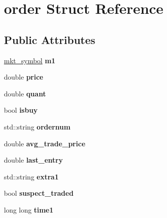 \hypertarget{structorder}{}\section{order Struct Reference}
\label{structorder}
\subsection*{Public Attributes}
\begin{DoxyCompactItemize}
\item 
\mbox{\label{structorder_adfdd240082d4e6d30de53a47ccd678bc}} 
\mbox{\hyperlink{structmkt__symbol}{mkt\+\_\+symbol}} {\bfseries m1}
\item 
\mbox{\label{structorder_abbe37d55c9bd4ffbbf69da056984d0fa}} 
double {\bfseries price}
\item 
\mbox{\label{structorder_ad2ba5985a42f5e49b15731bac9a29f5f}} 
double {\bfseries quant}
\item 
\mbox{\label{structorder_a56c072b0bd1f39f21e824b1de18c375d}} 
bool {\bfseries isbuy}
\item 
\mbox{\label{structorder_af78f0f44d81febc9ff4e71176bf0978d}} 
std\+::string {\bfseries ordernum}
\item 
\mbox{\label{structorder_af8b6bf16212fd4a1d12a4503cc3a83aa}} 
double {\bfseries avg\+\_\+trade\+\_\+price}
\item 
\mbox{\label{structorder_a8225dcc593e5c04322f90d1f5320ebd2}} 
double {\bfseries last\+\_\+entry}
\item 
\mbox{\label{structorder_ae1695741d714f9a9272bdbd5d932cd5a}} 
std\+::string {\bfseries extra1}
\item 
\mbox{\label{structorder_a3f98166837e422614c16593e8309ca00}} 
bool {\bfseries suspect\+\_\+traded}
\item 
\mbox{\label{structorder_a218b7239426a1603e30d93d8d89faf9b}} 
long long {\bfseries time1}
\item 

\end{DoxyCompactItemize}
